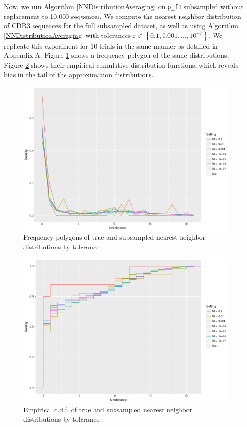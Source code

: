 \documentclass{article}
\begin{document}
Now, we run Algorithm \ref{NNDistributionAveraging} on \texttt{p\_f1} subsampled without replacement to 10,000 sequences.
We compute the nearest neighbor distribution of CDR3 sequences for the full subsampled dataset, as well as using Algorithm \ref{NNDistributionAveraging} with tolerances $\varepsilon \in \left\{0.1, 0.001, \dotsc, 10^{-7} \right\}$.
We replicate this experiment for 10 trials in the same manner as detailed in Appendix A.
Figure \ref{fig:NNFreqPoly} shows a frequency polygon of the same distributions.
Figure \ref{fig:NNECDF} shows their empirical cumulative distribution functions, which reveals bias in the tail of the approximation distributions.
\begin{figure}
    \includegraphics[width=\linewidth]{Figures/NearestNeighbor/CDR3/freqpoly_by_tol.pdf}
    \caption{Frequency polygons of true and subsampled nearest neighbor distributions by tolerance.}
    \label{fig:NNFreqPoly}
\end{figure}
\begin{figure}
    \includegraphics[width=\linewidth]{Figures/NearestNeighbor/CDR3/ecdf_by_tol.pdf}
    \caption{Empirical c.d.f. of true and subsampled nearest neighbor distributions by tolerance.}
    \label{fig:NNECDF}
\end{figure}
\end{document}
